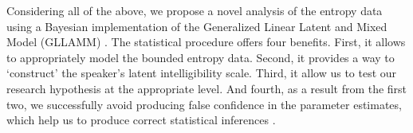 \begin{comment}
	As it was suggested, several factors are proposed by the literature, but these can be largely grouped into three categories: audiology, child and environmental related factors. For the first, they are the chronological age, age at implantation, the duration of device use, `hearing' age, bilateral or contralateral cochlear implantation, and the children's preoperative and postoperative hearing levels. For the second, there is the etiology or the cause of the hearing impairment (e.g. genetic, infections), additional disabilities (e.g. mental retardation, speech motor problems), and gender. Finally for the last, there is the communication modality. 
	
	Therefore, considering the aforementioned variables, and the relation complexity with themselves and the outcome, we believe that a causal framework would allow us to integrate previous literature on the matter, and also provide a more transparent way of state and analyze our research hypothesis.
	
\end{comment}

Considering all of the above, we propose a novel analysis of the entropy data using a Bayesian implementation of the Generalized Linear Latent and Mixed Model (GLLAMM) \citep{Rabe_et_al_2004a, Rabe_et_al_2004b, Rabe_et_al_2004c, Rabe_et_al_2012, Skrondal_et_al_2004a}. The statistical procedure offers four benefits. First, it allows to appropriately model the bounded entropy data. Second, it provides a way to `construct' the speaker's latent intelligibility scale. Third, it allow us to test our research hypothesis at the appropriate level. And fourth, as a result from the first two, we successfully avoid producing false confidence in the parameter estimates, which help us to produce correct statistical inferences \citep{McElreath_2020}.

